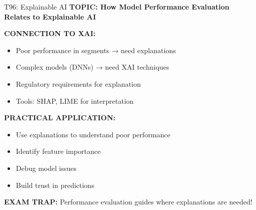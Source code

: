 \documentclass[8pt]{beamer}
\begin{document}
	\begin{frame}{T96: Explainable AI}
		\fontsize{6.5}{7.5}\selectfont
		\textbf{TOPIC: How Model Performance Evaluation Relates to Explainable AI}
		
		\vspace{0.1cm}
		\textbf{CONNECTION TO XAI:}
		\begin{itemize}
			\item Poor performance in segments → need explanations
			\item Complex models (DNNs) → need XAI techniques
			\item Regulatory requirements for explanation
			\item Tools: SHAP, LIME for interpretation
		\end{itemize}
		
		\vspace{0.1cm}
		\textbf{PRACTICAL APPLICATION:}
		\begin{itemize}
			\item Use explanations to understand poor performance
			\item Identify feature importance
			\item Debug model issues
			\item Build trust in predictions
		\end{itemize}
		
		\textcolor{myred}{\textbf{EXAM TRAP:}} Performance evaluation guides \textcolor{myblue}{where explanations are needed}!
	\end{frame}
	
\end{document}
